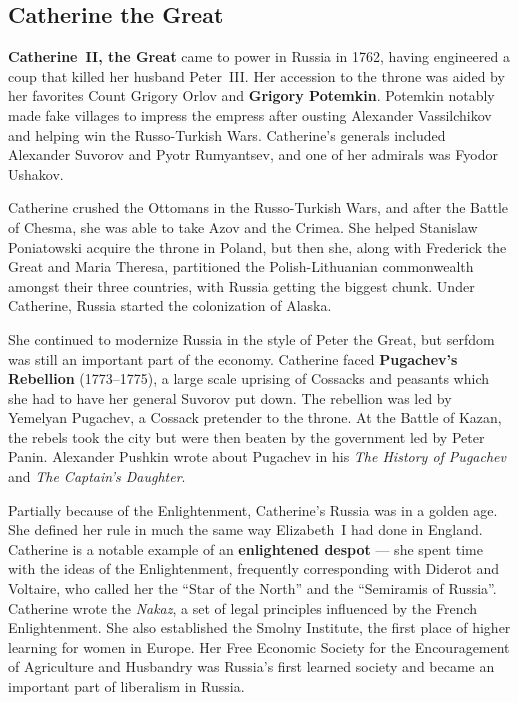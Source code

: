 \subsection*{Catherine the Great}

\textbf{Catherine~II, the Great} came to power in Russia in 1762,
having engineered a coup that killed her husband Peter~III\@.
Her accession to the throne was aided by her favorites Count Grigory Orlov and \textbf{Grigory Potemkin}.
Potemkin notably made fake villages to impress the empress
after ousting Alexander Vassilchikov and helping win the Russo-Turkish Wars.
Catherine's generals included Alexander Suvorov and Pyotr Rumyantsev,
and one of her admirals was Fyodor Ushakov.

Catherine crushed the Ottomans in the Russo-Turkish Wars,
and after the Battle of Chesma, she was able to take Azov and the Crimea.
She helped Stanislaw Poniatowski acquire the throne in Poland,
but then she, along with Frederick the Great and Maria Theresa,
partitioned the Polish-Lithuanian commonwealth amongst their three countries,
with Russia getting the biggest chunk.
Under Catherine, Russia started the colonization of Alaska.

She continued to modernize Russia in the style of Peter the Great,
but serfdom was still an important part of the economy.
Catherine faced \textbf{Pugachev's Rebellion} (1773--1775),
a large scale uprising of Cossacks and peasants which she had to have her general Suvorov put down.
The rebellion was led by Yemelyan Pugachev, a Cossack pretender to the throne.
At the Battle of Kazan, the rebels took the city but were then beaten by the government led by Peter Panin.
Alexander Pushkin wrote about Pugachev in his
\textit{The History of Pugachev} and \textit{The Captain's Daughter}.

Partially because of the Enlightenment, Catherine's Russia was in a golden age.
She defined her rule in much the same way Elizabeth~I had done in England.
Catherine is a notable example of an \textbf{enlightened despot} ---
she spent time with the ideas of the Enlightenment, frequently corresponding with Diderot and Voltaire,
who called her the ``Star of the North'' and the ``Semiramis of Russia''.
Catherine wrote the \textit{Nakaz}, a set of legal principles influenced by the French Enlightenment.
She also established the Smolny Institute, the first place of higher learning for women in Europe.
Her Free Economic Society for the Encouragement of Agriculture and Husbandry
was Russia's first learned society and became an important part of liberalism in Russia.

